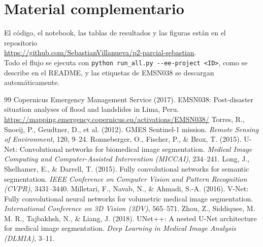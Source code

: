 \documentclass[10pt]{article}
\begin{document}
\section{Material complementario}
El código, el notebook, las tablas de resultados y las figuras están en el repositorio\\ \url{https://github.com/SebastianVillanueva/p2-parcial-sebastian}.\\ Todo el flujo se ejecuta con \texttt{python run\_all.py -{}-ee-project <ID>}, como se describe en el README, y las etiquetas de EMSN038 se descargan automáticamente.

{\small
\renewcommand{\section}[2]{\vspace{6pt}{\fontsize{12}{14}\bfseries Referencias\par}\vspace{2pt}}
\begin{thebibliography}{99}
\setlength{\itemsep}{1pt}
 Copernicus Emergency Management Service (2017). EMSN038: Post-disaster situation analyses of flood and landslides in Lima, Peru. \url{https://mapping.emergency.copernicus.eu/activations/EMSN038/}
 Torres, R., Snoeij, P., Geudtner, D., et al. (2012). GMES Sentinel-1 mission. \emph{Remote Sensing of Environment}, 120, 9--24.
 Ronneberger, O., Fischer, P., \& Brox, T. (2015). U-Net: Convolutional networks for biomedical image segmentation. \emph{Medical Image Computing and Computer-Assisted Intervention (MICCAI)}, 234--241.
 Long, J., Shelhamer, E., \& Darrell, T. (2015). Fully convolutional networks for semantic segmentation. \emph{IEEE Conference on Computer Vision and Pattern Recognition (CVPR)}, 3431--3440.
 Milletari, F., Navab, N., \& Ahmadi, S.-A. (2016). V-Net: Fully convolutional neural networks for volumetric medical image segmentation. \emph{International Conference on 3D Vision (3DV)}, 565--571.
 Zhou, Z., Siddiquee, M. M. R., Tajbakhsh, N., \& Liang, J. (2018). UNet++: A nested U-Net architecture for medical image segmentation. \emph{Deep Learning in Medical Image Analysis (DLMIA)}, 3--11.

\end{thebibliography}}
\end{document}
